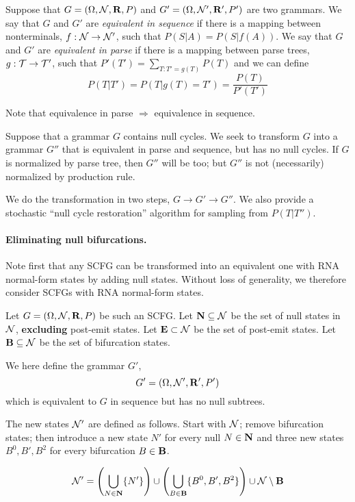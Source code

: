 \documentclass[10pt]{article}
\begin{document}
Suppose that $G = ( \Omega, {\cal N}, {\bf R}, P )$ and $G' = ( \Omega, {\cal N}', {\bf R}', P' )$ are two grammars.
We say that $G$ and $G'$ are {\em equivalent in sequence} if there is a mapping between nonterminals, $f:{\cal N} \to {\cal N}'$,
such that $P(S|A) = P(S|f(A))$.
We say that $G$ and $G'$ are {\em equivalent in parse} if there is a mapping between parse trees, $g:{\cal T} \to {\cal T}'$,
such that $P'(T') = \sum_{T:T'=g(T)} P(T)$ and we can define
\[
P(T|T') = P(T|g(T)=T') = \frac{P(T)}{P'(T')}
\]

Note that equivalence in parse $\Rightarrow$ equivalence in sequence.

Suppose that a grammar $G$ contains null cycles.
We seek to transform $G$ into a grammar $G''$ that is equivalent in parse and sequence, but has no null cycles.
If $G$ is normalized by parse tree, then $G''$ will be too; but $G''$ is not (necessarily) normalized by production rule.

We do the transformation in two steps, $G \to G' \to G''$.
We also provide a stochastic ``null cycle restoration'' algorithm for sampling from $P(T|T'')$.


\paragraph{Eliminating null bifurcations.}

Note first that any SCFG can be transformed into an equivalent one with RNA normal-form states by adding null states.
Without loss of generality, we therefore consider SCFGs with RNA normal-form states.

Let $G = ( \Omega, {\cal N}, {\bf R}, P )$ be such an SCFG.
Let ${\bf N} \subseteq {\cal N}$ be the set of null states in ${\cal N}$, {\bf excluding} post-emit states.
Let ${\bf E} \subset {\cal N}$ be the set of post-emit states.
Let ${\bf B} \subseteq {\cal N}$ be the set of bifurcation states.

We here define the grammar $G'$,
\[
G' = \left( \Omega, {\cal N}', {\bf R}', P' \right)
\]
which is equivalent to $G$ in sequence but has no null subtrees.

The new states ${\cal N}'$ are defined as follows.
Start with ${\cal N}$; remove bifurcation states;
then introduce a new state $N'$ for every null $N \in {\bf N}$ and three new states $B^0, B', B^2$ for every bifurcation $B \in {\bf B}$.

\[
{\cal N}' = 
\left( \bigcup_{N \in {\bf N}} \{ N' \} \right) \cup \left( \bigcup_{B \in {\bf B}} \{ B^0, B', B^2 \} \right) \cup {\cal N} \setminus {\bf B}
\]
\end{document}
